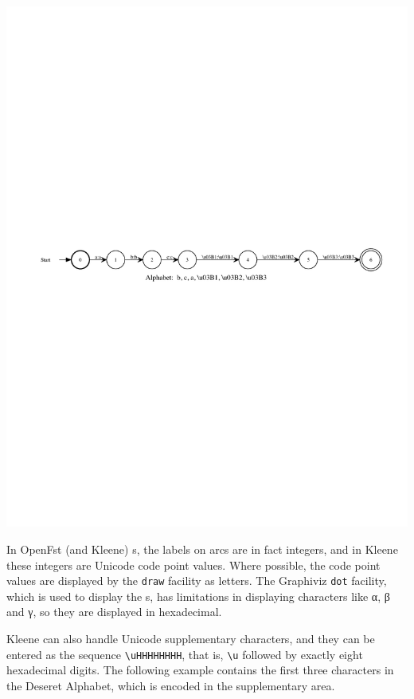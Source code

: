 \begin{center}
\includegraphics[width=135mm]{images/alphabetagamma.pdf}
\end{center}

\noindent
In OpenFst (and Kleene) \fsm{}s, the labels on arcs are in fact integers,
and in Kleene these integers are Unicode code point values.  Where possible,
the code point values are displayed by the \texttt{draw} facility as
letters.  The Graphiviz \texttt{dot}
facility, which is used to display the \fsm{}s, has limitations in displaying characters
like α, β and γ, so they are displayed in hexadecimal.  

Kleene can also handle Unicode supplementary characters, and they can be entered as the
 sequence
\verb!\uHHHHHHHH!, that is, \verb!\u! followed by exactly eight hexadecimal digits.  The following
example contains the first three characters in the Deseret Alphabet, which is encoded in
the supplementary area.


